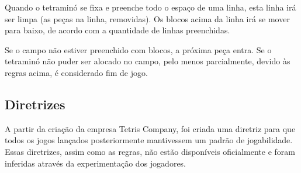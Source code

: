 \documentclass[
	12pt,				%
	openright,			%
	oneside,			%
	a4paper,			%
	brazil,				%
	]{abntex2}
\begin{document}
Quando o tetraminó se fixa e preenche todo o espaço de uma linha, esta linha irá ser limpa (as peças na linha, removidas). Os blocos acima da linha irá se mover para baixo, de acordo com a quantidade de linhas preenchidas.

Se o campo não estiver preenchido com blocos, a próxima peça entra. Se o tetraminó não puder ser alocado no campo, pelo menos parcialmente, devido às regras acima, é considerado fim de jogo.

\subsection{Diretrizes}

A partir da criação da empresa Tetris Company, foi criada uma diretriz para que todos os jogos lançados posteriormente mantivessem um padrão de jogabilidade. Essas diretrizes, assim como as regras, não estão disponíveis oficialmente e foram inferidas através da experimentação dos jogadores.
\end{document}
